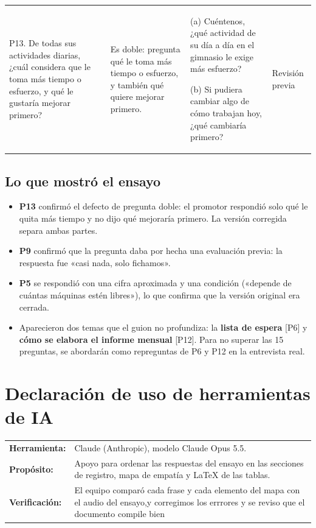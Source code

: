 \documentclass[12pt,a4paper]{article}
\begin{document}
\begin{longtable}{>{\raggedright\arraybackslash}p{4.2cm} >{\raggedright\arraybackslash}p{3.4cm} >{\raggedright\arraybackslash}p{5.2cm} >{\raggedright\arraybackslash}p{1.9cm}}
\rowcolor{lilaS}P13. De todas sus actividades diarias, ¿cuál considera que le toma más tiempo o esfuerzo, y qué le gustaría mejorar primero? & Es doble: pregunta qué le toma más tiempo o esfuerzo, y también qué quiere mejorar primero. & (a) Cuéntenos, ¿qué actividad de su día a día en el gimnasio le exige más esfuerzo?\par\smallskip (b) Si pudiera cambiar algo de cómo trabajan hoy, ¿qué cambiaría primero? & Revisión previa \\
\end{longtable}
\endgroup

\subsection*{Lo que mostró el ensayo}

\begin{itemize}[noitemsep]
  \item \textbf{P13} confirmó el defecto de pregunta doble: el promotor respondió solo qué le quita más tiempo y no dijo qué mejoraría primero. La versión corregida separa ambas partes.
  \item \textbf{P9} confirmó que la pregunta daba por hecha una evaluación previa: la respuesta fue «casi nada, solo fichamos».
  \item \textbf{P5} se respondió con una cifra aproximada y una condición («depende de cuántas máquinas estén libres»), lo que confirma que la versión original era cerrada.
  \item Aparecieron dos temas que el guion no profundiza: la \textbf{lista de espera} [P6] y \textbf{cómo se elabora el informe mensual} [P12]. Para no superar las 15 preguntas, se abordarán como repreguntas de P6 y P12 en la entrevista real.
\end{itemize}

\section{Declaración de uso de herramientas de IA}

\begin{tabularx}{\textwidth}{>{\raggedright\arraybackslash}p{3.0cm} Y}
\textbf{Herramienta:} & Claude (Anthropic), modelo Claude Opus 5.5. \\
\textbf{Propósito:} & Apoyo para ordenar las respuestas del ensayo en las secciones de registro, mapa de empatía y \LaTeX{} de las tablas. \\
\textbf{Verificación:} & El equipo comparó cada frase y cada elemento del mapa con el audio del ensayo,y corregimos los errrores y se reviso que el documento compile bien \\
\end{tabularx}
\end{document}

